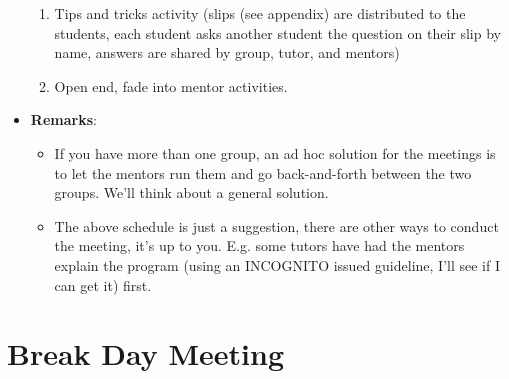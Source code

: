 \begin{itemize}
\begin{enumerate}
		\item Tips and tricks activity (slips (see appendix) are distributed to the students, each student asks another student the question on their slip by name, answers are shared by group, tutor, and mentors)

		\item Open end, fade into mentor activities.

	\end{enumerate}

	\item \textbf{Remarks}:

	\begin{itemize}

        \item If you have more than one group, an ad hoc solution for the meetings is to let the mentors run them and go back-and-forth between the two groups.
          We'll think about a general solution.

        \item The above schedule is just a suggestion, there are other ways to conduct the meeting, it's up to you.
          E.g. some tutors have had the mentors explain the program (using an INCOGNITO issued guideline, I'll see if I can get it) first.

	\end{itemize}

\end{itemize}

\section{Break Day Meeting}

